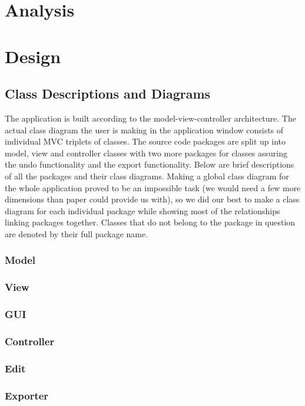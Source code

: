 \documentclass[a4paper]{article}
\newcommand{\tab}{\hspace*{1.5em}}
\begin{document}

\newpage
\tableofcontents 
\newpage

\section{Analysis}
	
\section{Design}
	\subsection{Class Descriptions and Diagrams}
		\tab The application is built according to the model-view-controller architecture. The actual class diagram the user is making in the application window consists of individual MVC triplets of classes. The source code packages are split up into model, view and controller classes with two more packages for classes assuring the undo functionality and the export functionality. Below are brief descriptions of all
the packages and their class diagrams. Making a global class diagram for the whole application proved to be an impossible task (we would need a few more dimensions than paper could provide us with), so we did our best to make a class diagram for each individual package while showing most of the relationships linking packages together. Classes that do not belong to the package in question are denoted by their full package name.
		\subsubsection{Model}
			
		\subsubsection{View}
		\subsubsection{GUI}
		\subsubsection{Controller}
		\subsubsection{Edit}
		\subsubsection{Exporter}
\end{document}
